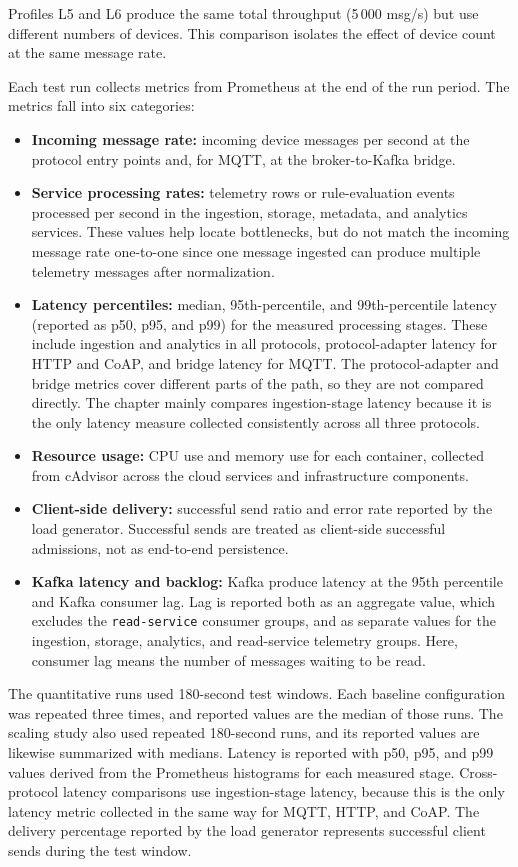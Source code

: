 Profiles L5 and L6 produce the same total throughput (5\,000 msg/s) but use different numbers of devices. This comparison isolates the effect of device count at the same message rate.

Each test run collects metrics from Prometheus at the end of the run period. The metrics fall into six categories:

\begin{itemize}
    \item \textbf{Incoming message rate:} incoming device messages per second at the protocol entry points and, for \gls{MQTT}, at the broker-to-Kafka bridge.
    \item \textbf{Service processing rates:} telemetry rows or rule-evaluation events processed per second in the ingestion, storage, metadata, and analytics services. These values help locate bottlenecks, but do not match the incoming message rate one-to-one since one message ingested can produce multiple telemetry messages after normalization.
    \item \textbf{Latency percentiles:} median, 95th-percentile, and 99th-percentile latency (reported as p50, p95, and p99) for the measured processing stages. These include ingestion and analytics in all protocols, protocol-adapter latency for \gls{HTTP} and \gls{CoAP}, and bridge latency for \gls{MQTT}. The protocol-adapter and bridge metrics cover different parts of the path, so they are not compared directly. The chapter mainly compares ingestion-stage latency because it is the only latency measure collected consistently across all three protocols.
    \item \textbf{Resource usage:} CPU use and memory use for each container, collected from cAdvisor across the cloud services and infrastructure components.
    \item \textbf{Client-side delivery:} successful send ratio and error rate reported by the load generator. Successful sends are treated as client-side successful admissions, not as end-to-end persistence.
    \item \textbf{Kafka latency and backlog:} Kafka produce latency at the 95th percentile and Kafka consumer lag. Lag is reported both as an aggregate value, which excludes the \texttt{read-service} consumer groups, and as separate values for the ingestion, storage, analytics, and read-service telemetry groups. Here, consumer lag means the number of messages waiting to be read.
\end{itemize}

The quantitative runs used 180-second test windows. Each baseline configuration was repeated three times, and reported values are the median of those runs. The scaling study also used repeated 180-second runs, and its reported values are likewise summarized with medians. Latency is reported with p50, p95, and p99 values derived from the Prometheus histograms for each measured stage. Cross-protocol latency comparisons use ingestion-stage latency, because this is the only latency metric collected in the same way for \gls{MQTT}, \gls{HTTP}, and \gls{CoAP}. The delivery percentage reported by the load generator represents successful client sends during the test window.

